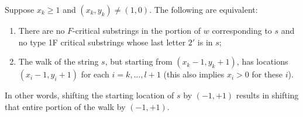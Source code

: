 \documentclass[ALCO,ThmDefs,Unicode,epreuves]{cedram}
\begin{document}
\begin{lemma} \label{lem:shifting-walks-F}
Suppose $x_k\ge 1$ and $(x_k,y_k)\neq (1,0)$. The following are equivalent:
\begin{enumerate}[label={(\roman*)}]
\item\label{lemma5.12_i} %
There are no $F$-critical substrings in the portion of $w$ corresponding to $s$ and no type 1F critical substrings whose last letter $2'$ is in $s$;
\item\label{lemma5.12_ii} %
The walk of the string $s$, but starting from $(x_k-1,y_k+1)$, has locations $(x_i-1,y_i+1)$ for each $i = k, \ldots, l+1$ \textup{(}this also implies $x_i > 0$ for these $i$\textup{)}.
\end{enumerate}
\end{lemma}
In other words, shifting the starting location of $s$ by $(-1,+1)$ results in shifting that entire portion of the walk by $(-1,+1)$.
\end{document}
